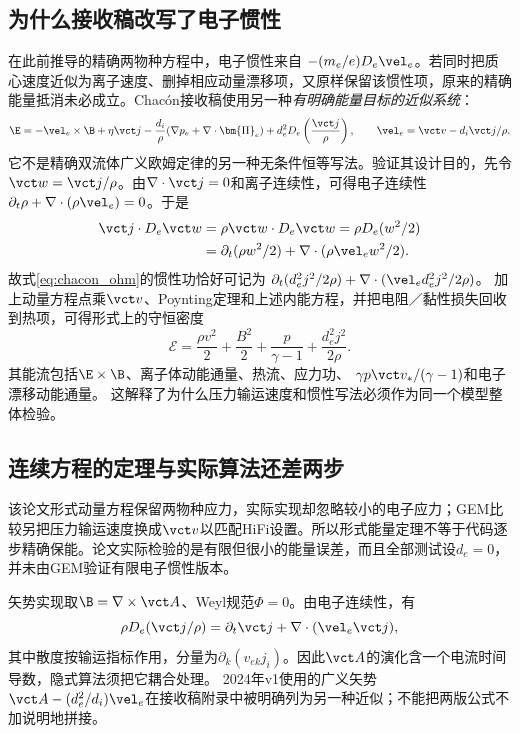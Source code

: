 \subsection{为什么接收稿改写了电子惯性}
在此前推导的精确两物种方程中，电子惯性来自
$-(m_e/e)D_e\vel_e$。若同时把质心速度近似为离子速度、删掉相应动量漂移项，又原样保留该惯性项，原来的精确能量抵消未必成立。Chacón接收稿使用另一种\emph{有明确能量目标的近似系统}：
\begin{equation}
 \E=-\vel_e\times\B+\eta\vct j
 -\frac{d_i}{\rho}(\nabla p_e+\nabla\cdot\bm{\Pi}_e)
 +d_e^2D_e\left(\frac{\vct j}{\rho}\right),
 \qquad \vel_e=\vct v-d_i\vct j/\rho.
 \label{eq:chacon_ohm}
\end{equation}
它不是精确双流体广义欧姆定律的另一种无条件恒等写法。验证其设计目的，先令$\vct w=\vct j/\rho$。由$\nabla\cdot\vct j=0$和离子连续性，可得电子连续性
$\partial_t\rho+\nabla\cdot(\rho\vel_e)=0$。于是
\begin{align}
 \vct j\cdot D_e\vct w
 &=\rho\vct w\cdot D_e\vct w=\rho D_e(w^2/2)\nonumber\\
 &=\partial_t(\rho w^2/2)+\nabla\cdot(\rho\vel_e w^2/2).
 \label{eq:current_energy}
\end{align}
故式\eqref{eq:chacon_ohm}的惯性功恰好可记为
$\partial_t(d_e^2j^2/2\rho)+\nabla\cdot(\vel_e d_e^2j^2/2\rho)$。
加上动量方程点乘$\vct v$、Poynting定理和上述内能方程，并把电阻／黏性损失回收到热项，可得形式上的守恒密度
\begin{equation}
 \mathcal E=\frac{\rho v^2}{2}+\frac{B^2}{2}
 +\frac{p}{\gamma-1}+\frac{d_e^2j^2}{2\rho}.
\end{equation}
其能流包括$\E\times\B$、离子体动能通量、热流、应力功、
$\gamma p\vct v_*/(\gamma-1)$和电子漂移动能通量。
这解释了为什么压力输运速度和惯性写法必须作为同一个模型整体检验。

\subsection{连续方程的定理与实际算法还差两步}
该论文形式动量方程保留两物种应力，实际实现却忽略较小的电子应力；GEM比较另把压力输运速度换成$\vct v$以匹配HiFi设置。所以形式能量定理不等于代码逐步精确保能。论文实际检验的是有限但很小的能量误差，而且全部测试设$d_e=0$，并未由GEM验证有限电子惯性版本。

矢势实现取$\B=\nabla\times\vct A$、Weyl规范$\Phi=0$。由电子连续性，有
\begin{equation}
 \rho D_e(\vct j/\rho)=\partial_t\vct j
 +\nabla\cdot(\vel_e\vct j),
\end{equation}
其中散度按输运指标作用，分量为$\partial_k(v_{ek}j_i)$。因此$\vct A$的演化含一个电流时间导数，隐式算法须把它耦合处理。
2024年v1使用的广义矢势$\vct A-(d_e^2/d_i)\vel_e$在接收稿附录中被明确列为另一种近似；不能把两版公式不加说明地拼接。

